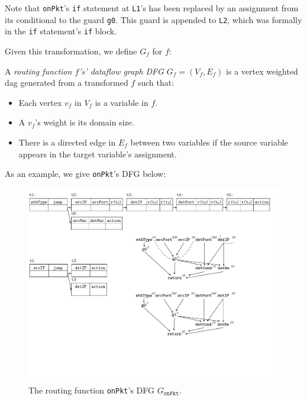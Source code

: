 Note that \texttt{onPkt}'s \texttt{if} statement at \texttt{L1}'s has been replaced by an assignment from its conditional to the guard \texttt{g0}. This guard is appended to \texttt{L2}, which was formally in the \texttt{if} statement's \texttt{if} block.

Given this transformation, we define $G_f$ for $f$:

\begin{definition} A {\em routing function $f$'s' dataflow graph DFG $G_f = (V_f, E_f)$} is a vertex weighted dag generated from a transformed $f$ such that:
\begin{itemize}
  \item Each vertex $v_f$ in $V_f$ is a variable in $f$.
  \item A $v_f$'s weight is its domain size.
  \item There is a directed edge in $E_f$ between two variables if the source variable appears in the target variable's assignment.
\end{itemize}
\end{definition}

As an example, we give \texttt{onPkt}'s DFG below:
\begin{figure}[tbh]
    \centering
    \vspace{-1mm}
    \includegraphics[scale = 0.6]{figures/figure2.pdf}
    \vspace{-2mm}
    \caption{The routing function \texttt{onPkt}'s DFG $G_{\texttt{onPkt}}$.}
    \label{fig:onpkt-dfg}
    \vspace{-2mm}
\end{figure}

